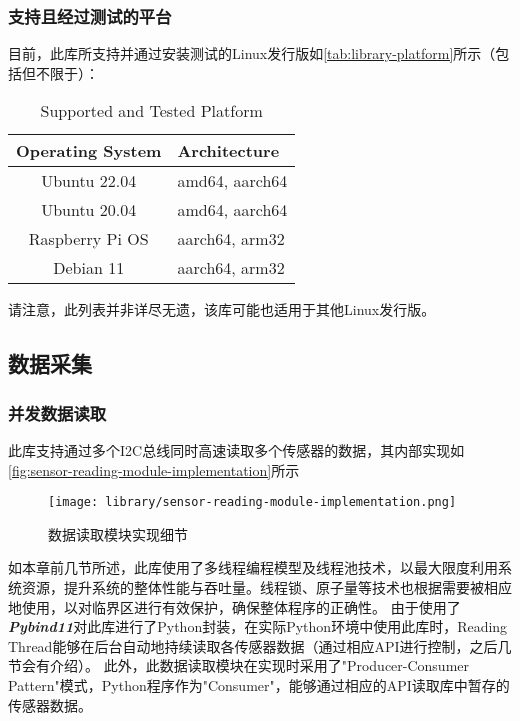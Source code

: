 \subsubsection{支持且经过测试的平台}
目前，此库所支持并通过安装测试的Linux发行版如\autoref{tab:library-platform}所示（包括但不限于）：

\begin{table}[ht]
    \caption{\label{tab:library-platform}Supported and Tested Platform}
    \begin{tabularx}{\linewidth}{|c|X<{\centering}|}
        \hline
        {\bfseries Operating System} & {\bfseries Architecture} \\ \hline
        Ubuntu 22.04 & amd64, aarch64 \\ \hline
        Ubuntu 20.04 & amd64, aarch64 \\ \hline
        Raspberry Pi OS & aarch64, arm32 \\ \hline
        Debian 11 & aarch64, arm32 \\ \hline
    \end{tabularx}
\end{table}
请注意，此列表并非详尽无遗，该库可能也适用于其他Linux发行版。
\subsection{数据采集}
\subsubsection{并发数据读取}
此库支持通过多个I2C总线同时高速读取多个传感器的数据，其内部实现如\autoref{fig:sensor-reading-module-implementation}所示

\begin{figure}[H]
    \centering
    \texttt{[image: library/sensor-reading-module-implementation.png]}
    \caption{\label{fig:sensor-reading-module-implementation}数据读取模块实现细节}
\end{figure}

如本章前几节所述，此库使用了多线程编程模型及线程池技术，以最大限度利用系统资源，提升系统的整体性能与吞吐量。线程锁、原子量等技术也根据需要被相应地使用，以对临界区进行有效保护，确保整体程序的正确性。
由于使用了{\bfseries \itshape Pybind11}对此库进行了Python封装，在实际Python环境中使用此库时，Reading Thread能够在后台自动地持续读取各传感器数据（通过相应API进行控制，之后几节会有介绍）。
此外，此数据读取模块在实现时采用了"Producer-Consumer Pattern"模式，Python程序作为"Consumer"，能够通过相应的API读取库中暂存的传感器数据。

